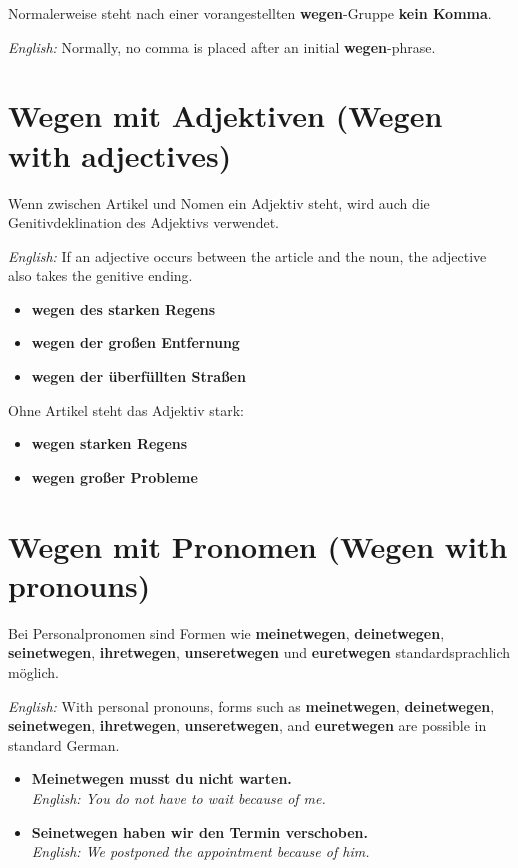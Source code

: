 \documentclass[a4paper]{article}
\begin{document}
   Normalerweise steht nach einer vorangestellten \textbf{wegen}-Gruppe \textbf{kein Komma}.

   \textit{English:} Normally, no comma is placed after an initial \textbf{wegen}-phrase.

   \section{Wegen mit Adjektiven \textnormal{(Wegen with adjectives)}}

   Wenn zwischen Artikel und Nomen ein Adjektiv steht, wird auch die Genitivdeklination des Adjektivs verwendet.

   \textit{English:} If an adjective occurs between the article and the noun, the adjective also takes the genitive ending.

   \begin{itemize}
      \item \textbf{wegen des starken Regens}
      \item \textbf{wegen der großen Entfernung}
      \item \textbf{wegen der überfüllten Straßen}
   \end{itemize}

   Ohne Artikel steht das Adjektiv stark:

   \begin{itemize}
      \item \textbf{wegen starken Regens}
      \item \textbf{wegen großer Probleme}
   \end{itemize}

   \section{Wegen mit Pronomen \textnormal{(Wegen with pronouns)}}

   Bei Personalpronomen sind Formen wie \textbf{meinetwegen}, \textbf{deinetwegen}, \textbf{seinetwegen}, \textbf{ihretwegen}, \textbf{unseretwegen} und \textbf{euretwegen} standardsprachlich möglich.

   \textit{English:} With personal pronouns, forms such as \textbf{meinetwegen}, \textbf{deinetwegen}, \textbf{seinetwegen}, \textbf{ihretwegen}, \textbf{unseretwegen}, and \textbf{euretwegen} are possible in standard German.

   \begin{itemize}
      \item \textbf{Meinetwegen musst du nicht warten.}\\
      \textit{English: You do not have to wait because of me.}
      \item \textbf{Seinetwegen haben wir den Termin verschoben.}\\
      \textit{English: We postponed the appointment because of him.}
   \end{itemize}
\end{document}
